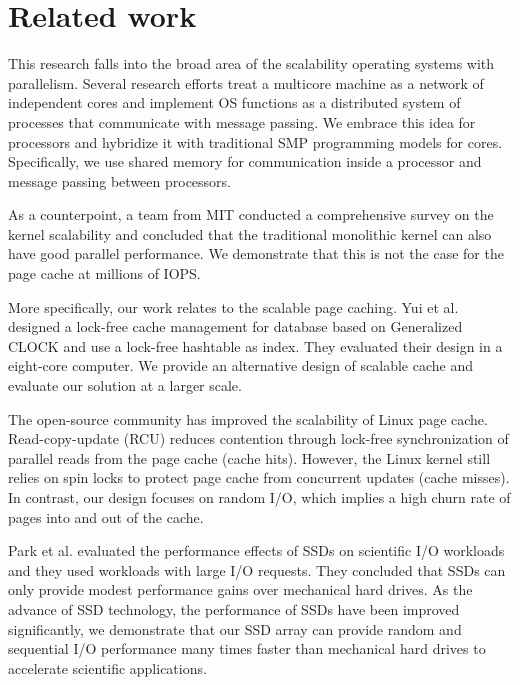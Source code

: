 \section{Related work}

This research falls into the broad area of the scalability operating systems
with parallelism.  Several research efforts \cite{fos, barrelfish} treat a
multicore machine as a network of independent cores and implement OS
functions as a distributed system of processes that communicate with message passing.
We embrace this idea for processors and hybridize it with traditional SMP programming models
for cores.  Specifically, we use shared memory for communication inside a processor 
and message passing between processors.

As a counterpoint, a team from MIT \cite{mit_scale} conducted a comprehensive
survey on the kernel scalability and concluded that the traditional monolithic
kernel can also have good parallel performance.  We demonstrate that this is 
not the case for the page cache at millions of IOPS.

More specifically, our work relates to the scalable page cach\-ing.
Yui et al. \cite{nbgclock} designed a lock-free cache management for database
based on Generalized CLOCK \cite{gclock} and use a lock-free hashtable as index.
They evaluated their design in a eight-core computer.
We provide an alternative
design of scalable cache and evaluate our solution at a larger scale.

The open-source community has improved the scalability of Linux page cache.
Read-copy-update (RCU) \cite{rcu} reduces contention through lock-free synchronization 
of parallel reads from the page cache (cache hits).  However, the Linux kernel still 
relies on spin locks to protect page cache from concurrent updates (cache misses).
In contrast, our design focuses on random I/O, which implies a high churn rate
of pages into and out of the cache.

Park et al. \cite{park09} evaluated the performance effects of SSDs on scientific
I/O workloads and they used workloads with large I/O requests. They concluded that 
SSDs can only provide modest performance gains over mechanical hard drives.
As the advance of SSD technology, the performance of SSDs have been improved
significantly, we demonstrate that our SSD array can provide random and sequential
I/O performance many times faster than mechanical hard drives to accelerate
scientific applications.

